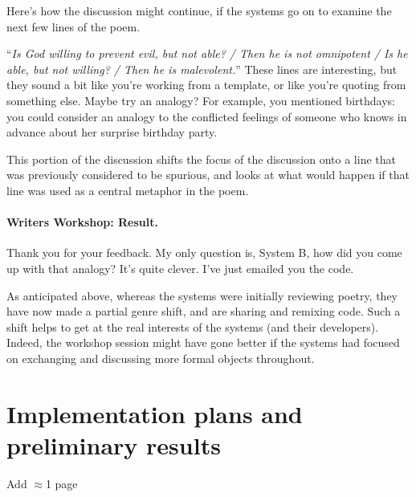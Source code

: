 \documentclass{article}
\begin{document}
Here's how the discussion might continue, if the systems go on to
examine the next few lines of the poem.
\begin{center}
\begin{minipage}{.9\columnwidth}
\begin{dialogue}
 ``\emph{Is God willing to prevent evil, but not able? / Then he is not omnipotent / Is he able, but not willing? / Then he is malevolent.}''
%
 These lines are interesting, but
they sound a bit like you're working from a
template, or like you're quoting from something
else.
%
 Maybe try an analogy?  For example, you mentioned
birthdays: you could consider an analogy to the conflicted feelings of
someone who knows in advance about her surprise birthday party.
\end{dialogue}
\end{minipage}
\end{center}

This portion of the discussion shifts the focus
of the discussion onto a line that was previously
considered to be spurious, and looks at what
would happen if that line was used as a central
metaphor in the poem.

\paragraph{Writers Workshop: Result.} 

\begin{center}
\begin{minipage}{.9\columnwidth}
\begin{dialogue}
 Thank you for your feedback.  My only question is, System
B, how did you come up with that analogy?  It's quite clever.
%
 I've just emailed you the code.
\end{dialogue}
\end{minipage}
\end{center}

As anticipated above, whereas the systems were initially reviewing
poetry, they have now made a partial genre shift, and are sharing and
remixing code.  Such a shift helps to get at the real interests of the
systems (and their developers).  Indeed, the workshop session might
have gone better if the systems had focused on exchanging and
discussing more formal objects throughout.

\section{Implementation plans and preliminary results}

Add $\approx$1 page
\newpage
~



\end{document}
